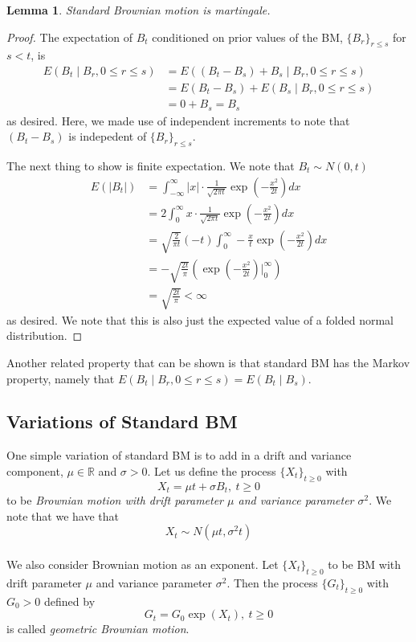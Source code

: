 \documentclass{article}
\newtheorem{lemma}[theorem]{Lemma}
\newcommand{\R}{\mathbb{R}}
\begin{document}
\begin{lemma}
Standard Brownian motion is martingale.
\end{lemma}
\begin{proof}
The expectation of $B_t$ conditioned on prior values of the BM, $\{B_r\}_{r\leq s}$ for $s<t$, is 
\begin{align*}
E(B_t \mid B_r, 0\leq r \leq s) &= E\left( \left( B_t - B_s\right) + B_s \mid B_r, 0\leq r \leq s\right) \\
&= E(B_t - B_s) + E\left(B_s \mid B_r, 0\leq r \leq s\right) \\
&= 0 + B_s = B_s
\end{align*}
as desired.  Here, we made use of independent increments to note that $(B_t-B_s)$ is indepedent of $\{B_r\}_{r\leq s}$.

The next thing to show is finite expectation.  We note that $B_t \sim N(0,t)$
\begin{align*}
E(|B_t|) &= \int_{-\infty}^\infty |x| \cdot \frac{1}{\sqrt{2\pi t}} \exp\left( -\frac{x^2}{2t}\right)dx \\
&= 2 \int_0^\infty x\cdot \frac{1}{\sqrt{2\pi t}} \exp\left( -\frac{x^2}{2t}\right)dx \\
&= \sqrt{\frac{2}{\pi t}} (-t) \int_0^\infty -\frac{x}{t} \exp\left( -\frac{x^2}{2t}\right)dx \\ 
&= -\sqrt{\frac{2t}{\pi}} \left( \exp\left(-\frac{x^2}{2t}\right) \Big|^\infty_0 \right) \\
&= \sqrt{\frac{2t}\pi} < \infty
\end{align*}
as desired.  We note that this is also just the expected value of a folded normal distribution.

\end{proof}

Another related property that can be shown is that standard BM has the Markov property, namely that 
$E(B_t \mid B_r, 0\leq r\leq s) = E(B_t \mid B_s)$.

\subsection{Variations of Standard BM}
One simple variation of standard BM is to add in a drift and variance component, $\mu \in \R$ and $\sigma>0$.  Let us define the process $\{X_t\}_{t\geq 0}$ with 
$$X_t = \mu t + \sigma B_t,\ t\geq 0$$
to be \emph{Brownian motion with drift parameter $\mu$ and variance parameter $\sigma^2$}.  We note that we have that 
$$X_t \sim N(\mu t, \sigma^2 t)$$
\\
We also consider Brownian motion as an exponent.  Let $\{X_t\}_{t\geq 0}$ to be BM with drift parameter $\mu$ and variance parameter $\sigma^2$.  Then the process $\{G_t\}_{t\geq 0}$ with $G_0 > 0$ defined by
$$ G_t = G_0 \exp(X_t),\ t\geq 0$$
is called \emph{geometric Brownian motion}.
\end{document}
